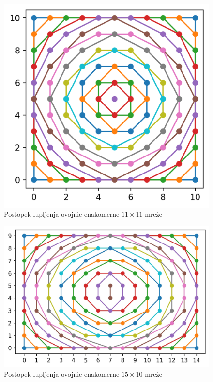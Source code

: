 \documentclass[a4paper]{article}
\begin{document}
\begin{figure}[!h]
	\centering
	\caption{Postopek lupljenja ovojnic enakomerne $11 \times 11$ mreže}
	\label{fig:11x11}
	\includegraphics[scale=0.6]{slike/11x11_enakomerna.png}
\end{figure}

\begin{figure}[!h]
	\centering
	\caption{Postopek lupljenja ovojnic enakomerne $15 \times 10$ mreže}
	\label{fig:15x10}
	\includegraphics[scale=0.6]{slike/15x10_enakomerna.jpg}
\end{figure}
\end{document}
